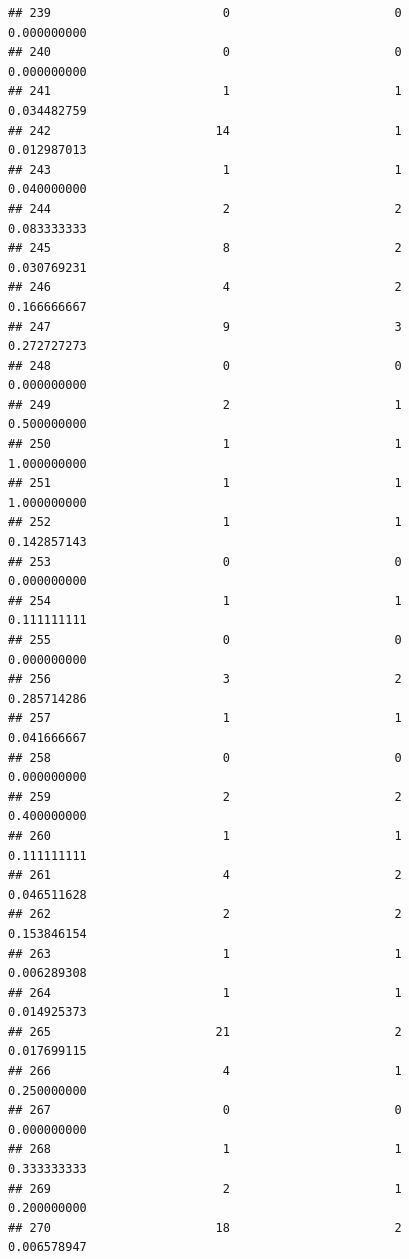 \documentclass[
]{article}
\begin{document}
\begin{verbatim}
## 239                        0                       0               0.000000000
## 240                        0                       0               0.000000000
## 241                        1                       1               0.034482759
## 242                       14                       1               0.012987013
## 243                        1                       1               0.040000000
## 244                        2                       2               0.083333333
## 245                        8                       2               0.030769231
## 246                        4                       2               0.166666667
## 247                        9                       3               0.272727273
## 248                        0                       0               0.000000000
## 249                        2                       1               0.500000000
## 250                        1                       1               1.000000000
## 251                        1                       1               1.000000000
## 252                        1                       1               0.142857143
## 253                        0                       0               0.000000000
## 254                        1                       1               0.111111111
## 255                        0                       0               0.000000000
## 256                        3                       2               0.285714286
## 257                        1                       1               0.041666667
## 258                        0                       0               0.000000000
## 259                        2                       2               0.400000000
## 260                        1                       1               0.111111111
## 261                        4                       2               0.046511628
## 262                        2                       2               0.153846154
## 263                        1                       1               0.006289308
## 264                        1                       1               0.014925373
## 265                       21                       2               0.017699115
## 266                        4                       1               0.250000000
## 267                        0                       0               0.000000000
## 268                        1                       1               0.333333333
## 269                        2                       1               0.200000000
## 270                       18                       2               0.006578947

\end{verbatim}
\end{document}
